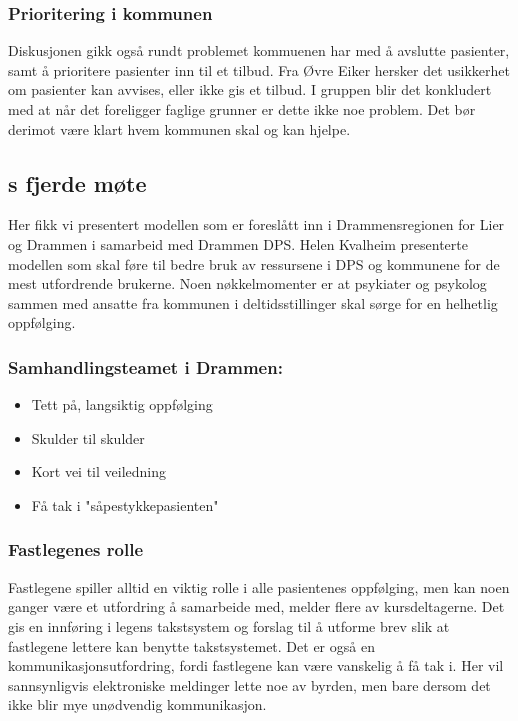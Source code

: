 \documentclass[11pt]{report} %
\begin{document}
                    \subsubsection{Prioritering i kommunen}
                    Diskusjonen gikk også rundt problemet kommuenen har med å avslutte pasienter, samt å prioritere pasienter inn til et tilbud. Fra Øvre Eiker hersker det usikkerhet om pasienter kan avvises, eller ikke gis et tilbud. I gruppen blir det konkludert med at når det foreligger faglige grunner er dette ikke noe problem. Det bør derimot være klart hvem kommunen skal og kan hjelpe.

                  \subsection{s fjerde møte}\label{sec:agr_4}
                    Her fikk vi presentert modellen som er foreslått inn i Drammensregionen for Lier og Drammen i samarbeid med Drammen DPS. Helen Kvalheim presenterte modellen som skal føre til bedre bruk av ressursene i DPS og kommunene for de mest utfordrende brukerne. Noen nøkkelmomenter er at psykiater og psykolog sammen med ansatte fra kommunen i deltidsstillinger skal sørge for en helhetlig oppfølging. 
                    \subsubsection{Samhandlingsteamet i Drammen:}
                     \begin{itemize}
                      \item Tett på, langsiktig oppfølging\\
                      \item Skulder til skulder\\
                      \item Kort vei til veiledning\\
                      \item Få tak i "såpestykkepasienten"\\
                     \end{itemize}
                    \subsubsection{Fastlegenes rolle}
                      Fastlegene spiller alltid en viktig rolle i alle pasientenes oppfølging, men kan noen ganger være et utfordring å samarbeide med, melder flere av kursdeltagerne. Det gis en innføring i legens takstsystem og forslag til å utforme brev slik at fastlegene lettere kan benytte takstsystemet. Det er også en kommunikasjonsutfordring, fordi fastlegene kan være vanskelig å få tak i. Her vil sannsynligvis elektroniske meldinger lette noe av byrden, men bare dersom det ikke blir mye unødvendig kommunikasjon.
\end{document}

